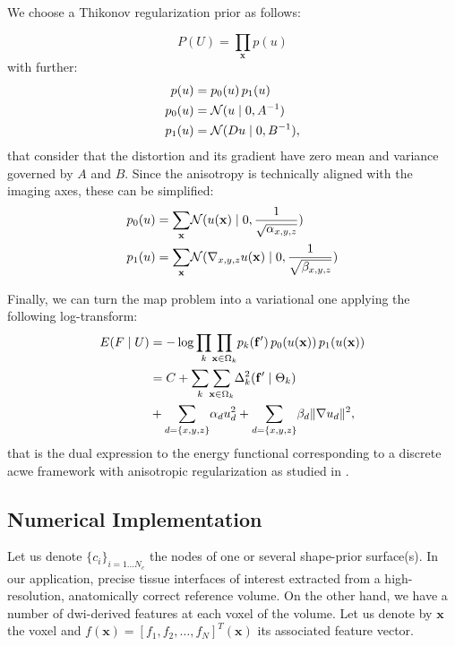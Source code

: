 We choose a Thikonov regularization prior as follows:

\begin{equation*}
P(U) = \underset{\mathbf{x}}{\prod} p(u)
\end{equation*}
with further:
\begin{align*}
p(u) &= p_0(u) \, p_1(u) \notag\\
p_0(u) &= \mathcal{N}( u \mid 0, A^{-1}) \notag\\
p_1(u) &= \mathcal{N}( Du \mid 0, B^{-1}),
\end{align*}
that consider that the distortion and its gradient have zero
mean and variance governed by $A$ and $B$. Since the anisotropy
is technically aligned with the imaging axes, these can
be simplified:
\begin{align}
p_0(u) &= \underset{\mathbf{x}}{\sum} \mathcal{N}( u(\mathbf{x}) \mid 0, \frac{1}{\sqrt{\alpha_{x,y,z}}}) \notag\\
p_1(u) &= \underset{\mathbf{x}}{\sum} \mathcal{N}( \nabla_{x,y,z}u(\mathbf{x}) \mid 0, \frac{1}{\sqrt{\beta_{x,y,z}}})
\label{eq:priors}
\end{align}

Finally, we can turn the \gls{map} problem into 
a variational one
applying the following log-transform:
\begin{align}
E(F \mid U) &= -\log \underset{k}{\prod}
\underset{\mathbf{x} \in \Omega_k}{\prod} 
p_k( \mathbf{f}')\,p_0( u(\mathbf{x}))\,p_1( u(\mathbf{x})) \notag\\
&= C + \underset{k}{\sum}
\underset{\mathbf{x} \in \Omega_k}{\sum}
\Delta^2_k (\mathbf{f}' \mid \Theta_k ) \notag\\
&+ \underset{d=\{x,y,z\}}{\sum} \alpha_d u^2_d
+ \underset{d=\{x,y,z\}}{\sum} \beta_d \|\nabla u_d\|^2,
\label{eq:energy}
\end{align}
that is the dual expression to the energy functional corresponding
to a discrete \gls*{acwe} framework \citep{chan_active_2001}
with anisotropic regularization as studied in
\citep{nagel_investigation_1986}.

\subsection{Numerical Implementation}
\label{sec:numerical_implementation}
%
Let us denote $\{c_i\}_{i=1 \ldots N_c}$ the nodes of one or several shape-prior
surface(s). In our application, precise tissue interfaces of interest 
extracted from a high-resolution, anatomically correct reference volume. 
On the other hand, we have a number of \gls{dwi}-derived features at each
voxel of the volume. Let us denote by $\mathbf{x}$ the voxel and $f(\mathbf{x}) = 
[ f_1, f_2, \ldots, f_N]^T(\mathbf{x})$ its associated feature vector.

